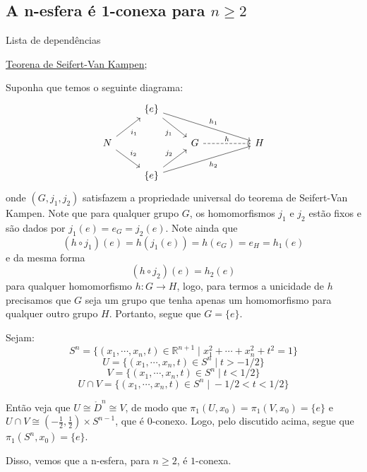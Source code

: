 \subsection{A n-esfera é 1-conexa para $n \geq 2$}
\label{n-esfera-1-conexa-ex}
\begin{titlemize}{Lista de dependências}
	\item \hyperref[seifert-van-kampen-prop]{Teorena de Seifert-Van Kampen};
\end{titlemize}

Suponha que temos o seguinte diagrama:
\[\begin{tikzcd}
	& {\{e\}} \\
	N && G && H \\
	& {\{e\}}
	\arrow["{j_1}"', from=1-2, to=2-3]
	\arrow["{h_1}", from=1-2, to=2-5]
	\arrow["{i_1}"', from=2-1, to=1-2]
	\arrow["{i_2}", from=2-1, to=3-2]
	\arrow["h", dashed, from=2-3, to=2-5]
	\arrow["{j_2}", from=3-2, to=2-3]
	\arrow["{h_2}"', from=3-2, to=2-5]
\end{tikzcd}\]
onde $(G, j_1, j_2)$ satisfazem a propriedade universal do teorema de Seifert-Van Kampen. Note que para qualquer grupo $G$, os homomorfismos $j_1$ e $j_2$ estão fixos e são dados por $j_1(e) = e_G = j_2(e)$. Note ainda que $$(h \circ j_1)(e) = h(j_1(e)) = h(e_G) = e_H = h_1(e)$$ e da mesma forma $$(h \circ j_2)(e) = h_2(e)$$ para qualquer homomorfismo $h:G\longrightarrow H$, logo, para termos a unicidade de $h$ precisamos que $G$ seja um grupo que tenha apenas um homomorfismo para qualquer outro grupo $H$. Portanto, segue que $G = \{e\}$.

\begin{ex}
	Sejam: $$S^n = \{(x_1, \cdots, x_n, t) \in \mathbb{R}^{n+1} \; | \; x_1^2+\cdots+x_n^2+t^2 = 1\}$$ $$U = \{(x_1, \cdots, x_n, t) \in S^n \; | \; t > -1/2\}$$ $$V = \{(x_1, \cdots, x_n, t) \in S^n \; | \; t < 1/2\}$$ $$U \cap V = \{(x_1, \cdots, x_n, t) \in S^n \; | \; -1/2 < t < 1/2\}$$

    Então veja que $U \cong \mathring D^n \cong V$, de modo que $\pi_1(U, x_0) = \pi_1(V, x_0) = \{e\}$ e $U \cap V \cong (-\frac{1}{2}, \frac{1}{2}) \times S^{n-1}$, que é $0$-conexo. Logo, pelo discutido acima, segue que $\pi_1(S^n, x_0) = \{e\}$.
\end{ex}

Disso, vemos que a n-esfera, para $n \geq 2$, é $1$-conexa.